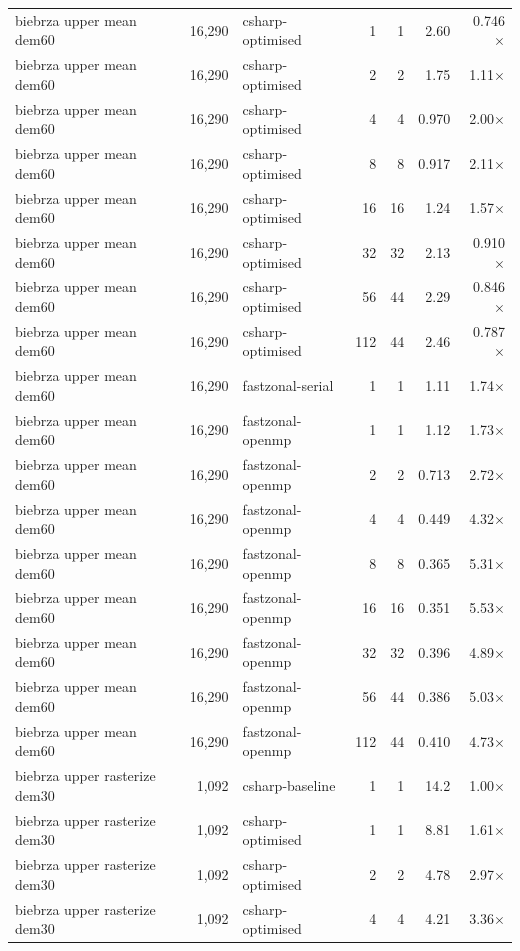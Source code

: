 \begin{tabular}{lrlrrrr}
biebrza upper mean dem60 & 16,290 & csharp-optimised & 1 & 1 & 2.60 & 0.746$\times$ \\
biebrza upper mean dem60 & 16,290 & csharp-optimised & 2 & 2 & 1.75 & 1.11$\times$ \\
biebrza upper mean dem60 & 16,290 & csharp-optimised & 4 & 4 & 0.970 & 2.00$\times$ \\
biebrza upper mean dem60 & 16,290 & csharp-optimised & 8 & 8 & 0.917 & 2.11$\times$ \\
biebrza upper mean dem60 & 16,290 & csharp-optimised & 16 & 16 & 1.24 & 1.57$\times$ \\
biebrza upper mean dem60 & 16,290 & csharp-optimised & 32 & 32 & 2.13 & 0.910$\times$ \\
biebrza upper mean dem60 & 16,290 & csharp-optimised & 56 & 44 & 2.29 & 0.846$\times$ \\
biebrza upper mean dem60 & 16,290 & csharp-optimised & 112 & 44 & 2.46 & 0.787$\times$ \\
biebrza upper mean dem60 & 16,290 & fastzonal-serial & 1 & 1 & 1.11 & 1.74$\times$ \\
biebrza upper mean dem60 & 16,290 & fastzonal-openmp & 1 & 1 & 1.12 & 1.73$\times$ \\
biebrza upper mean dem60 & 16,290 & fastzonal-openmp & 2 & 2 & 0.713 & 2.72$\times$ \\
biebrza upper mean dem60 & 16,290 & fastzonal-openmp & 4 & 4 & 0.449 & 4.32$\times$ \\
biebrza upper mean dem60 & 16,290 & fastzonal-openmp & 8 & 8 & 0.365 & 5.31$\times$ \\
biebrza upper mean dem60 & 16,290 & fastzonal-openmp & 16 & 16 & 0.351 & 5.53$\times$ \\
biebrza upper mean dem60 & 16,290 & fastzonal-openmp & 32 & 32 & 0.396 & 4.89$\times$ \\
biebrza upper mean dem60 & 16,290 & fastzonal-openmp & 56 & 44 & 0.386 & 5.03$\times$ \\
biebrza upper mean dem60 & 16,290 & fastzonal-openmp & 112 & 44 & 0.410 & 4.73$\times$ \\
biebrza upper rasterize dem30 & 1,092 & csharp-baseline & 1 & 1 & 14.2 & 1.00$\times$ \\
biebrza upper rasterize dem30 & 1,092 & csharp-optimised & 1 & 1 & 8.81 & 1.61$\times$ \\
biebrza upper rasterize dem30 & 1,092 & csharp-optimised & 2 & 2 & 4.78 & 2.97$\times$ \\
biebrza upper rasterize dem30 & 1,092 & csharp-optimised & 4 & 4 & 4.21 & 3.36$\times$ \\

\end{tabular}
